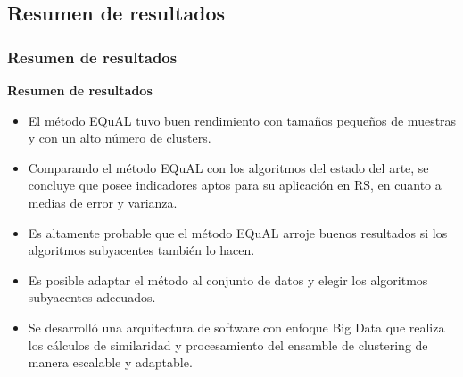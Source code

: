 \begin{frame}
\begin{figure}[h!]
{
		}
		\label{fig:performance1000}
	\end{figure}

\end{frame}

\subsection{Resumen de resultados}
\begin{frame}
	\frametitle{Resumen de resultados}
	\textbf{Resumen de resultados}
	\bigskip
	\begin{itemize}
		\item El método EQuAL tuvo buen rendimiento con tamaños pequeños de muestras y con un alto número de clusters.
		\item Comparando el método EQuAL con los algoritmos del estado del arte, se concluye que posee indicadores aptos para su aplicación en RS, en cuanto a medias de error y varianza.
		\item Es altamente probable que el método EQuAL arroje buenos resultados si los algoritmos subyacentes también lo hacen.
		\item Es posible adaptar el método al conjunto de datos y elegir los algoritmos subyacentes adecuados.
		\item Se desarrolló una arquitectura de software con enfoque Big Data que realiza los cálculos de similaridad y procesamiento del ensamble de clustering de manera escalable y adaptable.
	\end{itemize}
\end{frame}